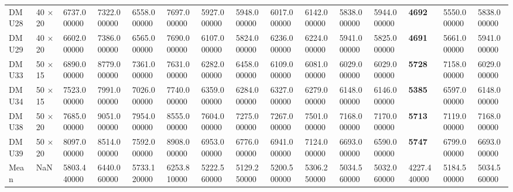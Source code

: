 \begin{tabular}{ll}
DMU28 & 40 × 20 & 6737.000000 & 7322.000000 & 6558.000000 & 7697.000000 & 5927.000000 & 5948.000000 & 6017.000000 & 6142.000000 & 5838.000000 & 5944.000000 & \textbf{4692} & 5550.000000 & 5838.000000 \\
DMU29 & 40 × 20 & 6602.000000 & 7386.000000 & 6565.000000 & 7690.000000 & 6107.000000 & 5824.000000 & 6236.000000 & 6224.000000 & 5941.000000 & 5825.000000 & \textbf{4691} & 5661.000000 & 5941.000000 \\
DMU33 & 50 × 15 & 6890.000000 & 8779.000000 & 7361.000000 & 7631.000000 & 6282.000000 & 6458.000000 & 6109.000000 & 6081.000000 & 6029.000000 & 6029.000000 & \textbf{5728} & 7158.000000 & 6029.000000 \\
DMU34 & 50 × 15 & 7523.000000 & 7991.000000 & 7026.000000 & 7740.000000 & 6359.000000 & 6284.000000 & 6327.000000 & 6279.000000 & 6148.000000 & 6146.000000 & \textbf{5385} & 6597.000000 & 6148.000000 \\
DMU38 & 50 × 20 & 7685.000000 & 9051.000000 & 7954.000000 & 8555.000000 & 7604.000000 & 7275.000000 & 7267.000000 & 7501.000000 & 7168.000000 & 7170.000000 & \textbf{5713} & 7119.000000 & 7168.000000 \\
DMU39 & 50 × 20 & 8097.000000 & 8514.000000 & 7592.000000 & 8908.000000 & 6953.000000 & 6776.000000 & 6941.000000 & 7124.000000 & 6693.000000 & 6590.000000 & \textbf{5747} & 6799.000000 & 6693.000000 \\
Mean & NaN & 5803.440000 & 6440.060000 & 5733.120000 & 6253.810000 & 5222.560000 & 5129.250000 & 5200.500000 & 5306.250000 & 5034.560000 & 5032.060000 & 4227.440000 & 5184.500000 & 5034.560000 \\
\bottomrule
\end{tabular}
